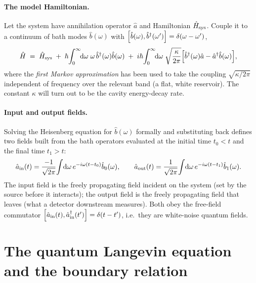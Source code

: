 \paragraph{The model Hamiltonian.}
Let the system have annihilation operator $\hat a$ and Hamiltonian
$\hat{H}_{\rm sys}$. Couple it to a continuum of bath modes
$\hat b(\omega)$ with $\comm{\hat b(\omega)}{\hat b^\dagger(\omega')}=\delta(\omega-\omega')$,
\begin{equation}
\label{eq:io-hamiltonian}
\hat{H} \;=\; \hat{H}_{\rm sys}
\;+\; \hbar\!\int_0^\infty\!\!\dd\omega\;\omega\,\hat b^\dagger(\omega)\hat b(\omega)
\;+\; i\hbar\!\int_0^\infty\!\!\dd\omega\;\sqrt{\frac{\kappa}{2\pi}}
\Bigl[\hat b^\dagger(\omega)\hat a - \hat a^\dagger\hat b(\omega)\Bigr],
\end{equation}
where the \emph{first Markov approximation} has been used to take
the coupling $\sqrt{\kappa/2\pi}$ independent of frequency over the
relevant band (a flat, white reservoir). The constant $\kappa$ will
turn out to be the cavity energy-decay rate.

\paragraph{Input and output fields.}
Solving the Heisenberg equation for $\hat b(\omega)$ formally and
substituting back defines two fields built from the bath operators
evaluated at the initial time $t_0<t$ and the final time $t_1>t$:
\begin{equation}
\label{eq:io-fields}
\hat a_{\rm in}(t) = \frac{-1}{\sqrt{2\pi}}\!\int\!\dd\omega\,e^{-i\omega(t-t_0)}\hat b_0(\omega),
\qquad
\hat a_{\rm out}(t) = \frac{1}{\sqrt{2\pi}}\!\int\!\dd\omega\,e^{-i\omega(t-t_1)}\hat b_1(\omega).
\end{equation}
The input field is the freely propagating field incident on the
system (set by the source before it interacts); the output field is
the freely propagating field that leaves (what a detector
downstream measures). Both obey the free-field commutator
$\comm{\hat a_{\rm in}(t)}{\hat a_{\rm in}^\dagger(t')}=\delta(t-t')$,
i.e.\ they are white-noise quantum fields.

\section{The quantum Langevin equation and the boundary relation}
\label{sec:langevin}

